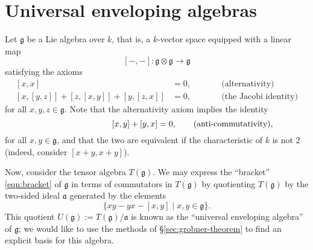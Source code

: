 \newcommand{\g}{\mathfrak{g}}
\renewcommand{\a}{\mathfrak{a}}
\newcommand{\gr}{\operatorname{gr}}
\newcommand{\Sym}{\operatorname{Sym}}

\section{Universal enveloping algebras}\label{sec:applications}

Let $\g$ be a Lie algebra over $k$, that is, a $k$-vector space equipped with a linear map
\begin{equation}
\label{eqn:bracket}
[-,-]\colon\g\otimes\g\to\g
\end{equation}
satisfying the axioms
\begin{equation*}
\begin{aligned}
[x,x]&=0,\\
[x,[y,z]]+[z,[x,y]]+[y,[z,x]]&=0,
\end{aligned}
\qquad
\begin{aligned}
&\text{(alternativity)}\\
&\text{(the Jacobi identity)}
\end{aligned}
\end{equation*}
for all $x,y,z\in\g$. Note that the alternativity axiom implies the identity
\begin{equation}
\hspace{8.5em}[x,y]+[y,x]=0,\qquad\text{(anti-commutativity)},
\end{equation}
for all $x,y\in\g$, and that the two are equivalent if the characteristic of $k$ is not $2$ (indeed, consider $[x+y,x+y]$).

Now, consider the tensor algebra $T(\g)$. We may express the ``bracket'' \eqref{eqn:bracket} of $\g$ in terms of commutators in $T(\g)$ by quotienting $T(\g)$ by the two-sided ideal $\a$ generated by the elements
\begin{equation}
\label{eqn:ueaideal}
\{xy-yx-[x,y]\mid x,y\in\g\}.
\end{equation}
This quotient $U(\g):=T(\g)/\a$ is known as the ``universal enveloping algebra'' of $\g$; we would like to use the methods of \S\ref{sec:grobner-theorem} to find an explicit basis for this algebra.

